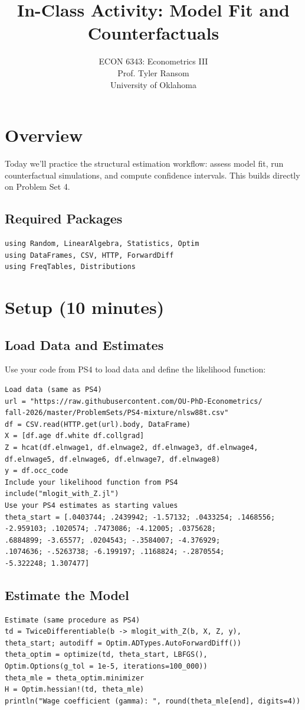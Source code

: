 \documentclass[12pt,english]{article}
\begin{document}
\title{In-Class Activity: Model Fit and Counterfactuals}
\author{ECON 6343: Econometrics III\\
Prof. Tyler Ransom\\
University of Oklahoma}
\date{}
\maketitle
\section*{Overview}
Today we'll practice the structural estimation workflow: assess model fit, run counterfactual simulations, and compute confidence intervals. This builds directly on Problem Set 4.
\subsection*{Required Packages}
\begin{verbatim}
using Random, LinearAlgebra, Statistics, Optim
using DataFrames, CSV, HTTP, ForwardDiff
using FreqTables, Distributions
\end{verbatim}
\section{Setup (10 minutes)}
\subsection{Load Data and Estimates}
Use your code from PS4 to load data and define the likelihood function:
\begin{verbatim}
Load data (same as PS4)
url = "https://raw.githubusercontent.com/OU-PhD-Econometrics/
fall-2026/master/ProblemSets/PS4-mixture/nlsw88t.csv"
df = CSV.read(HTTP.get(url).body, DataFrame)
X = [df.age df.white df.collgrad]
Z = hcat(df.elnwage1, df.elnwage2, df.elnwage3, df.elnwage4,
df.elnwage5, df.elnwage6, df.elnwage7, df.elnwage8)
y = df.occ_code
Include your likelihood function from PS4
include("mlogit_with_Z.jl")
Use your PS4 estimates as starting values
theta_start = [.0403744; .2439942; -1.57132; .0433254; .1468556;
-2.959103; .1020574; .7473086; -4.12005; .0375628;
.6884899; -3.65577; .0204543; -.3584007; -4.376929;
.1074636; -.5263738; -6.199197; .1168824; -.2870554;
-5.322248; 1.307477]
\end{verbatim}
\subsection{Estimate the Model}
\begin{verbatim}
Estimate (same procedure as PS4)
td = TwiceDifferentiable(b -> mlogit_with_Z(b, X, Z, y),
theta_start; autodiff = Optim.ADTypes.AutoForwardDiff())
theta_optim = optimize(td, theta_start, LBFGS(),
Optim.Options(g_tol = 1e-5, iterations=100_000))
theta_mle = theta_optim.minimizer
H = Optim.hessian!(td, theta_mle)
println("Wage coefficient (gamma): ", round(theta_mle[end], digits=4))
\end{verbatim}
\end{document}
